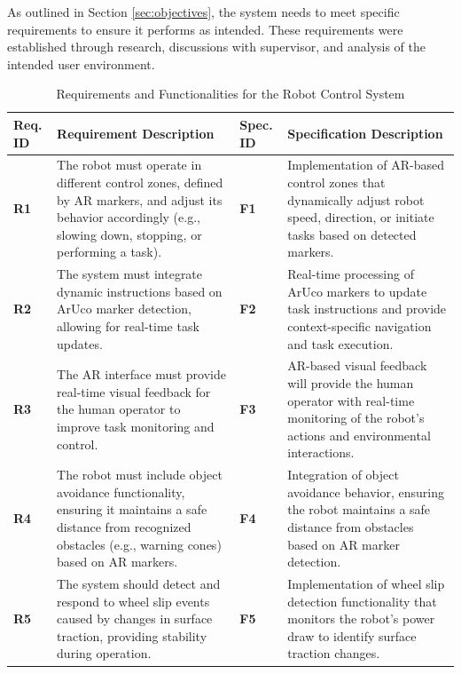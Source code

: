As outlined in Section \ref{sec:objectives}, the system needs to meet specific requirements to ensure it performs as intended. These requirements were established through research, discussions with supervisor, and analysis of the intended user environment.

\begin{table}[h]
	\centering
	\begin{tabular}{|p{0.9cm}|p{6cm}|p{0.9cm}|p{6cm}|}
		\hline
		\textbf{Req. ID} & \textbf{Requirement Description}                                                                                                                                    & \textbf{Spec. ID} & \textbf{Specification Description}                                                                                                        \\ \hline
		\textbf{R1}      & The robot must operate in different control zones, defined by AR markers, and adjust its behavior accordingly (e.g., slowing down, stopping, or performing a task). & \textbf{F1}       & Implementation of AR-based control zones that dynamically adjust robot speed, direction, or initiate tasks based on detected markers.     \\ \hline
		\textbf{R2}      & The system must integrate dynamic instructions based on ArUco marker detection, allowing for real-time task updates.                                                & \textbf{F2}       & Real-time processing of ArUco markers to update task instructions and provide context-specific navigation and task execution.             \\ \hline
		\textbf{R3}      & The AR interface must provide real-time visual feedback for the human operator to improve task monitoring and control.                                              & \textbf{F3}       & AR-based visual feedback will provide the human operator with real-time monitoring of the robot’s actions and environmental interactions. \\ \hline
		\textbf{R4}      & The robot must include object avoidance functionality, ensuring it maintains a safe distance from recognized obstacles (e.g., warning cones) based on AR markers.   & \textbf{F4}       & Integration of object avoidance behavior, ensuring the robot maintains a safe distance from obstacles based on AR marker detection.       \\ \hline
		\textbf{R5}      & The system should detect and respond to wheel slip events caused by changes in surface traction, providing stability during operation.                              & \textbf{F5}       & Implementation of wheel slip detection functionality that monitors the robot's power draw to identify surface traction changes.           \\ \hline
	\end{tabular}
	\caption{Requirements and Functionalities for the Robot Control System}
	\label{tab:requirements_functionalities}
\end{table}


